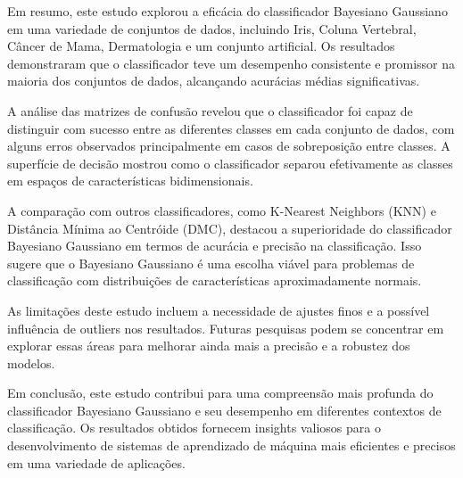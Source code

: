 \documentclass[12pt, a4paper]{report}
\begin{document}
Em resumo, este estudo explorou a eficácia do classificador Bayesiano Gaussiano em uma variedade de conjuntos de dados, incluindo Iris, Coluna Vertebral, Câncer de Mama, Dermatologia e um conjunto artificial. Os resultados demonstraram que o classificador teve um desempenho consistente e promissor na maioria dos conjuntos de dados, alcançando acurácias médias significativas.

A análise das matrizes de confusão revelou que o classificador foi capaz de distinguir com sucesso entre as diferentes classes em cada conjunto de dados, com alguns erros observados principalmente em casos de sobreposição entre classes. A superfície de decisão mostrou como o classificador separou efetivamente as classes em espaços de características bidimensionais.

A comparação com outros classificadores, como K-Nearest Neighbors (KNN) e Distância Mínima ao Centróide (DMC), destacou a superioridade do classificador Bayesiano Gaussiano em termos de acurácia e precisão na classificação. Isso sugere que o Bayesiano Gaussiano é uma escolha viável para problemas de classificação com distribuições de características aproximadamente normais.

As limitações deste estudo incluem a necessidade de ajustes finos e a possível influência de outliers nos resultados. Futuras pesquisas podem se concentrar em explorar essas áreas para melhorar ainda mais a precisão e a robustez dos modelos.

Em conclusão, este estudo contribui para uma compreensão mais profunda do classificador Bayesiano Gaussiano e seu desempenho em diferentes contextos de classificação. Os resultados obtidos fornecem insights valiosos para o desenvolvimento de sistemas de aprendizado de máquina mais eficientes e precisos em uma variedade de aplicações.




\end{document}
